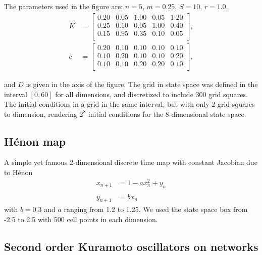 \documentclass[preprint,superscriptaddress,
nofootinbib,amsmath,amssymb,aps]{revtex4-1}
\begin{document}
The parameters used in the figure are: $n = 5$, $m = 0.25$, $S = 10$, $r = 1.0$, 
\begin{align*}
        K &= \begin{bmatrix}
        0.20 & 0.05 & 1.00 & 0.05 & 1.20 \\
        0.25 & 0.10 & 0.05 & 1.00 & 0.40 \\ 
        0.15 & 0.95 & 0.35 & 0.10 & 0.05 \\
        \end{bmatrix}, \\
        c &= \begin{bmatrix}
        0.20 &0.10 &0.10 &0.10 &0.10\\
        0.10 &0.20 &0.10 &0.10 &0.20\\
        0.10 &0.10 &0.20 &0.20 &0.10 \\
    \end{bmatrix},
\end{align*}

and $D$ is given in the axis of the figure. The grid in state space was defined in the interval $[0, 60]$ for all dimensions, and discretized to include $300$ grid squares. The initial conditions in a grid in the same interval, but with only $2$ grid squares to dimension, rendering $2^8$ initial conditions for the $8$-dimensional state space. 


\subsection*{Hénon map}
A simple yet famous 2-dimensional discrete time map with constant Jacobian due to H\'enon
\begin{align*}
    x_{n+1} &= 1 - ax^2_n+y_n \\\\
    y_{n+1} & = bx_n
\end{align*}
with $b = 0.3$ and $a$ ranging from 1.2 to 1.25. We used the state space box from -2.5 to 2.5 with 500 cell points in each dimension.

\subsection*{Second order Kuramoto oscillators on networks}
\end{document}
